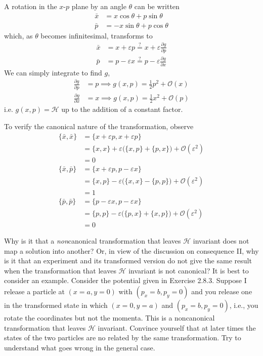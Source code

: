 \documentclass[../principles-of-quantum-mechanics.tex]{subfiles}
\begin{document}
\begin{questions}
		\begin{solution}
			A rotation in the $x$-$p$ plane by an angle $\theta$ can be written
			\begin{align*}
				\bar{x} &= x\cos\theta + p\sin\theta \\
				\bar{p} &= -x\sin\theta + p\cos\theta
			\end{align*}
			which, as $\theta$ becomes infinitesimal, transforms to
			\begin{align*}
				\bar{x} &= x + \varepsilon p \stackrel{?}{=} x + \varepsilon\frac{\partial g}{\partial p}\\
				\bar{p} &= p - \varepsilon x \stackrel{?}{=} p - \varepsilon\frac{\partial g}{\partial x}
			\end{align*}
			We can simply integrate to find $g$,
			\begin{align*}
				\frac{\partial g}{\partial p} &= p \implies g(x, p) = \frac{1}{2}p^2 + \mathcal{O}(x) \\
				\frac{\partial g}{\partial x} &= x \implies g(x, p) = \frac{1}{2}x^2 + \mathcal{O}(p)
			\end{align*}
			i.e. $g(x, p) = \mathcal{H}$ up to the addition of a constant factor.
			
			To verify the canonical nature of the transformation, observe
			\begin{align*}
				\{\bar{x}, \bar{x}\} &= \{x + \varepsilon p, x + \varepsilon p\} \\
									&= \{x, x\} + \varepsilon\Big(\{x, p\} + \{p, x\}\Big) + \mathcal{O}(\varepsilon^2) \\
									&= 0 \\
				\{\bar{x}, \bar{p}\} &= \{x + \varepsilon p, p - \varepsilon x\} \\
				&= \{x, p\} - \varepsilon\Big(\{x, x\} - \{p, p\}\Big) + \mathcal{O}(\varepsilon^2) \\
				&= 1 \\
				\{\bar{p}, \bar{p}\} &= \{p - \varepsilon x, p - \varepsilon x\} \\
				&= \{p, p\} - \varepsilon\Big(\{p, x\} + \{x, p\}\Big) + \mathcal{O}(\varepsilon^2) \\
				&= 0
			\end{align*}
		\end{solution}
		
		\question Why is it that a \textit{non}canonical transformation that leaves $\mathcal{H}$ invariant does not map a solution into another? Or, in view of the discussion on consequence II, why is it that an experiment and its transformed version do not give the same result when the transformation that leaves $\mathcal{H}$ invariant is not canonical? It is best to consider an example. Consider the potential given in Exercise 2.8.3. Suppose I release a particle at $(x = a, y = 0)$ with $(p_x = b, p_y = 0)$ and you release one in the transformed state in which $(x=0, y=a)$ and $(p_x=b, p_y=0)$, i.e., you rotate the coordinates but not the momenta. This is a noncanonical transformation that leaves $\mathcal{H}$ invariant. Convince yourself that at later times the states of the two particles are no related by the same transformation. Try to understand what goes wrong in the general case.
		

\end{questions}
\end{document}
